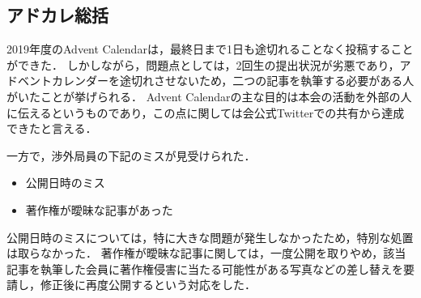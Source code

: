 \subsection*{アドカレ総括}


2019年度のAdvent Calendarは，最終日まで1日も途切れることなく投稿することができた．
しかしながら，問題点としては，2回生の提出状況が劣悪であり，アドベントカレンダーを途切れさせないため，二つの記事を執筆する必要がある人がいたことが挙げられる．
Advent Calendarの主な目的は本会の活動を外部の人に伝えるというものであり，この点に関しては会公式Twitterでの共有から達成できたと言える．

一方で，渉外局員の下記のミスが見受けられた．
\begin{itemize}
\item 公開日時のミス
\item 著作権が曖昧な記事があった
\end{itemize}
公開日時のミスについては，特に大きな問題が発生しなかったため，特別な処置は取らなかった．
著作権が曖昧な記事に関しては，一度公開を取りやめ，該当記事を執筆した会員に著作権侵害に当たる可能性がある写真などの差し替えを要請し，修正後に再度公開するという対応をした．

